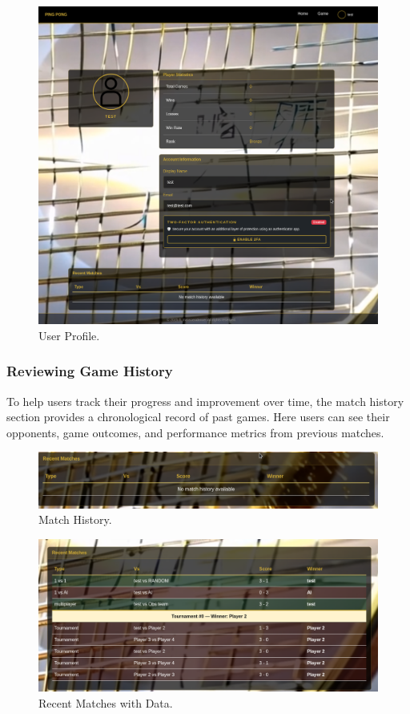 \begin{figure}[H]
    \centering
    \includegraphics[width=0.65\linewidth]{Figures/images/new_images/ProfilePage.png}
    \caption{User Profile.} %
    \label{fig:profile-page-journey}
\end{figure}

\subsubsection{Reviewing Game History} To help users track their progress and improvement over time, the match history section provides a chronological record of past games. Here users can see their opponents, game outcomes, and performance metrics from previous matches.

\begin{figure}[H]
    \centering
    \includegraphics[width=0.65\linewidth]{Figures/images/new_images/History.png}
    \caption{Match History.} %
    \label{fig:match-history-journey}
\end{figure}

\begin{figure}[H]
    \centering
    \includegraphics[width=0.65\linewidth]{Figures/images/new_images/RecentMatchesWithData.png}
    \caption{Recent Matches with Data.} %
    \label{fig:recent-matches-data-journey}
\end{figure}


